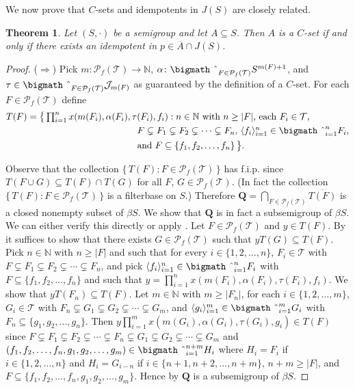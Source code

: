 \documentclass[12pt]{article}
\theoremstyle{plain}
\newtheorem{thm}{Theorem}[section]
\theoremstyle{definition}
\newcommand{\la}{\langle}
\newcommand{\ra}{\rangle}
\newcommand{\bbN}{\mathbb{N}}
\newcommand{\calJ}{\mathcal{J}}
\newcommand{\calT}{\mathcal{T}}
\newcommand{\Pf}{\mathcal{P}_f}
\newcommand{\bigtimes}{\hbox{\bigmath \char'2}}
\begin{document}
We now prove that $C$-sets and idempotents in $J(S)$ are closely related.
\begin{thm}
  \label{thm:csets}
  Let $(S, \cdot)$ be a semigroup and let $A \subseteq S$. 
  Then $A$ is a $C$-set if and only if there exists an idempotent in $p \in \overline{A} \cap J(S)$.
\end{thm}
\begin{proof}
  ($\Rightarrow$)
  Pick $m \colon \Pf(\calT) \to \bbN$, $\alpha \colon \bigtimes_{F \in \Pf(\calT)} S^{m(F)+1}$, and $\tau \in \bigtimes_{F \in \Pf(\calT)} \calJ_{m(F)}$ as guaranteed by the definition of a $C$-set. 
  For each $F \in \Pf(\calT)$ define 
  \begin{align*}
    T(F) &= \bigl\{\, \textstyle \prod_{i=1}^n x(m(F_i), \alpha(F_i), \tau(F_i), f_i) : \mbox{$n \in \bbN$ with $n \ge |F|$, each $F_i \in \calT$,}\\
 &\hspace{12em}\mbox{$F \subsetneq F_1 \subsetneq F_2 \subsetneq \cdots \subsetneq F_n$, $\la f_i \ra_{i=1}^n \in \bigtimes_{i=1}^n F_i$,} \\
 &\hspace{12em} \mbox{and $F \subseteq \{f_1, f_2, \ldots, f_n\}$} \,\bigr\}.
  \end{align*}

  Observe that the collection $\{\, T(F) : F \in \Pf(\calT) \,\}$ has f.i.p. since $T(F \cup G) \subseteq T(F) \cap T(G)$ for all $F$, $G \in \Pf(\calT)$.
  (In fact the collection $\{\, T(F) : F \in \Pf(\calT) \,\}$ is a filterbase on $S$.)
  Therefore $\mathbf{Q} = \bigcap_{F \in \Pf(\calT)} \overline{T(F)}$ is a closed nonempty subset of $\beta S$. 
  We show that $\mathbf{Q}$ is in fact a subsemigroup of $\beta S$.
  We can either verify this directly or apply \cite[Theorem 4.20]{Hindman:1998fk}.
  Let $F \in \Pf(\calT)$ and $y \in T(F)$.
  By \cite[Theorem 4.20]{Hindman:1998fk} it suffices to show that there exists $G \in \Pf(\calT)$ such that $yT(G) \subseteq T(F)$. 
  Pick $n \in \bbN$ with $n \ge |F|$ and such that for every $i \in \{1, 2, \ldots, n\}$, $F_i \in \calT$ with $F \subsetneq F_1 \subsetneq F_2 \subsetneq \cdots \subsetneq F_n$, and pick $\la f_i \ra_{i=1}^n \in \bigtimes_{i=1}^n F_i$ with $F \subseteq \{f_1, f_2, \ldots, f_n\}$ and such that $y = \prod_{i=1}^n x(m(F_i), \alpha(F_i), \tau(F_i), f_i)$. 
  We show that $yT(F_n) \subseteq T(F)$. 
  Let $m \in \bbN$ with $m \ge |F_n|$, for each $i \in \{1, 2, \ldots, m\}$, $G_i \in \calT$ with $F_n \subsetneq G_1 \subsetneq G_2 \subsetneq \cdots \subsetneq G_m$, and $\la g_i \ra_{i=1}^m \in \bigtimes_{i=1}^m G_i$ with $F_n \subseteq \{g_1, g_2, \ldots, g_n\}$. 
  Then $y \prod_{i=1}^m x(m(G_i), \alpha(G_i), \tau(G_i), g_i) \in T(F)$ since $F \subsetneq F_1 \subsetneq F_2 \subsetneq \cdots \subsetneq F_n \subsetneq G_1 \subsetneq G_2 \subsetneq \cdots \subsetneq G_m$ and $(f_1, f_2, \ldots, f_n, g_1, g_2, \ldots, g_m) \in \bigtimes_{i=1}^{n+m} H_i$ where $H_i = F_i$ if $i \in \{1, 2, \ldots, n\}$ and $H_i = G_{i-n}$ if $i \in \{n+1, n+2, \ldots, n+m\}$, $n+m \ge |F|$, and $F \subseteq \{f_1, f_2, \ldots, f_n, g_1, g_2, \ldots, g_m\}$. 
  Hence by \cite[Theorem 4.20]{Hindman:1998fk} $\mathbf{Q}$ is a subsemigroup of $\beta S$. 


\end{proof}
\end{document}
